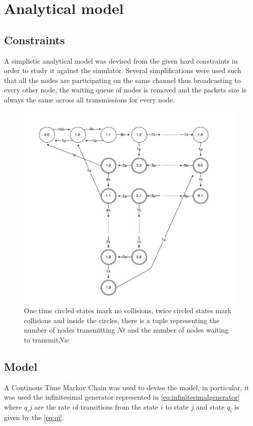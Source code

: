 \documentclass[conference]{IEEEtran}
\begin{document}
\section{Analytical model}\label{sec:analiticalmodel}

\subsection{Constraints}\label{sec:constraints}
A simplistic analytical model was devised from the given hard constraints in order to study it against the simulator. Several simplifications were used such that all the nodes are participating on the same channel thus broadcasting to every other node, the waiting queue of nodes is removed and the packets size is always the same across all transmissions for every node. 

\begin{figure}[t]
    \centering
    \includegraphics[width=\columnwidth]{graphs/MCTS}
    \caption{One time circled states mark no collisions, twice circled states mark collisions and inside the circles, there is a tuple representing the number of nodes transmitting \(Nt\) and the number of nodes waiting to transmit\(Nw\)}
    \label{fig:mcts}
\end{figure}

\subsection{Model}\label{sec:model}
A Continous Time Markov Chain was used to devise the model, in particular, it was used the infinitesimal generator represented in \cref{eq:infinitesimalgenerator} where \(q_ij\) are the rate of transitions from the state \(i\) to state \(j\) and state \(q_i\) is given by the \cref{eq:qi}.
\end{document}
